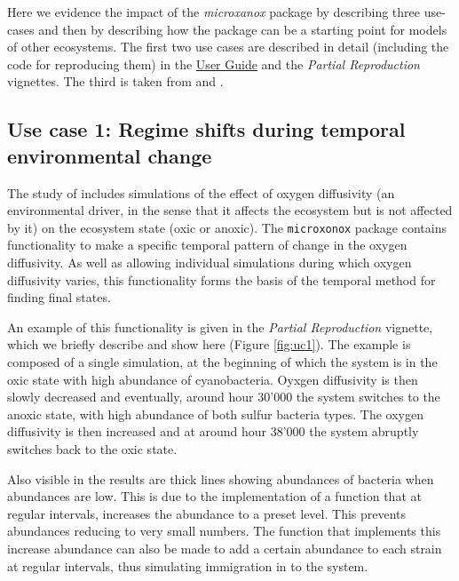\documentclass[]{elsarticle} %
\begin{document}
Here we evidence the impact of the \emph{microxanox} package by describing three use-cases and then by describing how the package can be a starting point for models of other ecosystems. The first two use cases are described in detail (including the code for reproducing them) in the \href{https://uzh-peg.r-universe.dev/articles/microxanox/User-guide.html}{User Guide} and the \emph{Partial Reproduction} vignettes. The third is taken from \citet{Limberger2023} and \citet{Petchey2022}.

\hypertarget{use-case-1-regime-shifts-during-temporal-environmental-change}{%
\subsection{Use case 1: Regime shifts during temporal environmental change}\label{use-case-1-regime-shifts-during-temporal-environmental-change}}

The study of \citet{Bush2017} includes simulations of the effect of oxygen diffusivity (an environmental driver, in the sense that it affects the ecosystem but is not affected by it) on the ecosystem state (oxic or anoxic). The \texttt{microxonox} package contains functionality to make a specific temporal pattern of change in the oxygen diffusivity. As well as allowing individual simulations during which oxygen diffusivity varies, this functionality forms the basis of the temporal method for finding final states.

An example of this functionality is given in the \emph{Partial Reproduction} vignette, which we briefly describe and show here (Figure \ref{fig:uc1}). The example is composed of a single simulation, at the beginning of which the system is in the oxic state with high abundance of cyanobacteria. Oyxgen diffusivity is then slowly decreased and eventually, around hour 30'000 the system switches to the anoxic state, with high abundance of both sulfur bacteria types. The oxygen diffusivity is then increased and at around hour 38'000 the system abruptly switches back to the oxic state.

Also visible in the results are thick lines showing abundances of bacteria when abundances are low. This is due to the implementation of a function that at regular intervals, increases the abundance to a preset level. This prevents abundances reducing to very small numbers. The function that implements this increase abundance can also be made to add a certain abundance to each strain at regular intervals, thus simulating immigration in to the system.
\end{document}
